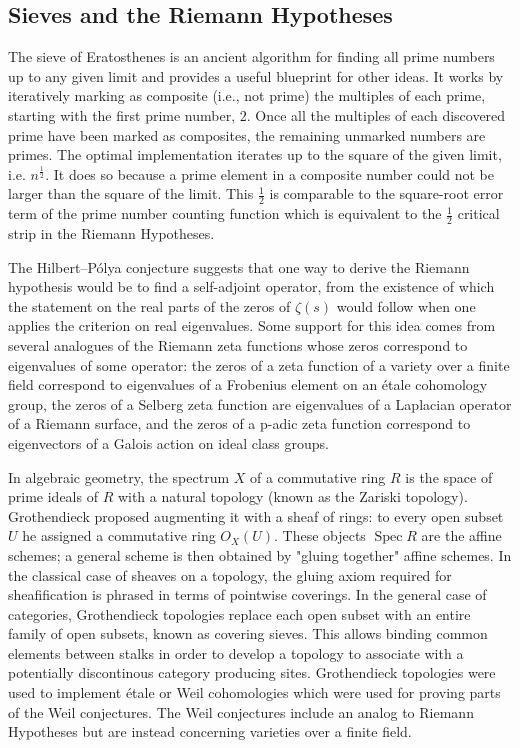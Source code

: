 \documentclass{article}
\theoremstyle{definition}
\begin{document}
\subsection{Sieves and the Riemann Hypotheses} 
\label{sec:sieve}

The sieve of Eratosthenes is an ancient algorithm for finding all prime numbers up to any given limit and provides a useful blueprint for other ideas.   
It works by iteratively marking as composite (i.e., not prime) the multiples of each prime, starting with the first prime number, $2$.
Once all the multiples of each discovered prime have been marked as composites, the remaining unmarked numbers are primes.
The optimal implementation iterates up to the square of the given limit, i.e. $n^{\frac{1}{2}}$. 
It does so because a prime element in a composite number could not be larger than the square of the limit.
This $\frac{1}{2}$ is comparable to the square-root error term of the prime number counting function which is equivalent to the $\frac{1}{2}$ critical strip in the Riemann Hypotheses.


The Hilbert–Pólya conjecture suggests that one way to derive the Riemann hypothesis would be to find a self-adjoint operator, from the existence of which the statement on the real parts of the zeros of $\zeta (s)$ would follow when one applies the criterion on real eigenvalues.
Some support for this idea comes from several analogues of the Riemann zeta functions whose zeros correspond to eigenvalues of some operator: the zeros of a zeta function of a variety over a finite field correspond to eigenvalues of a Frobenius element on an étale cohomology group, the zeros of a Selberg zeta function are eigenvalues of a Laplacian operator of a Riemann surface, and the zeros of a p-adic zeta function correspond to eigenvectors of a Galois action on ideal class groups.


In algebraic geometry, the spectrum $X$ of a commutative ring $R$ is the space of prime ideals of $R$ with a natural topology (known as the Zariski topology). Grothendieck proposed augmenting it with a sheaf of rings: to every open subset $U$ he assigned a commutative ring $O_X(U)$. 
These objects  ${\displaystyle \operatorname {Spec} {R}}$ are the affine schemes; a general scheme is then obtained by "gluing together" affine schemes.
In the classical case of sheaves on a topology, the gluing axiom required for sheafification is phrased in terms of pointwise coverings. 
In the general case of categories, Grothendieck topologies replace each open subset with an entire family of open subsets, known as covering sieves.
This allows binding common elements between stalks in order to develop a topology to associate with a potentially discontinous category producing sites.
Grothendieck topologies were used to implement étale or Weil cohomologies which were used for proving parts of the Weil conjectures.
The Weil conjectures include an analog to Riemann Hypotheses but are instead concerning varieties over a finite field.
\end{document}
